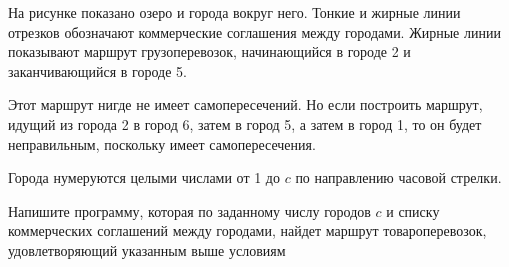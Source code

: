 На рисунке показано озеро и города вокруг него. Тонкие и жирные линии отрезков обозначают коммерческие соглашения между городами. Жирные линии показывают маршрут грузоперевозок, начинающийся в городе 2 и заканчивающийся в городе 5.

Этот маршрут нигде не имеет самопересечений. Но если построить маршрут, идущий из города 2 в город 6, затем в город 5, а затем в город 1, то он будет
неправильным, поскольку имеет самопересечения. 

Города нумеруются целыми числами от 1 до $c$ по направлению часовой стрелки. 

Напишите программу, которая по заданному числу городов $c$ и списку коммерческих
соглашений между городами, найдет маршрут товароперевозок, удовлетворяющий
указанным выше условиям